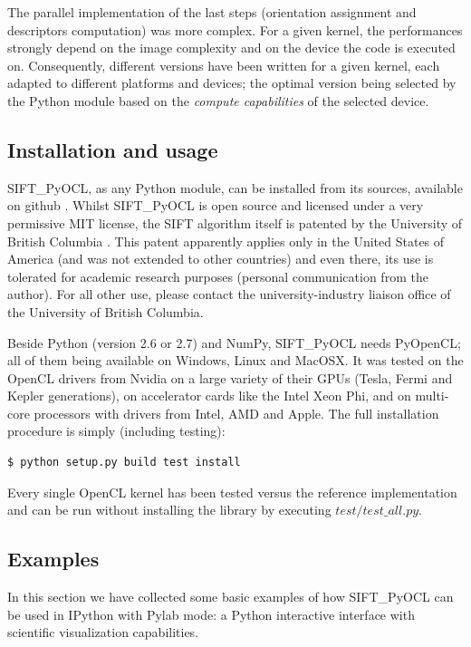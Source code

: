 \documentclass[preprint]{iucr}
\begin{document}
The parallel implementation of the last steps (orientation assignment and
descriptors computation) was more complex.
For a given kernel, the performances strongly depend on the image
complexity and on the device the code is executed on.
Consequently, different versions have been written for a given kernel, each
adapted to different platforms and
devices; the optimal version being selected by the
Python module based on the \emph{compute capabilities} of the selected device.


\subsection{Installation and usage}
SIFT\_PyOCL, as any Python module, can be installed from its sources,
available on github \cite{sift_pyocl}.
Whilst SIFT\_PyOCL is open source and licensed under a very
permissive MIT license, the SIFT algorithm itself is
patented by the University of British Columbia \cite{SIFT_pat}.
This patent apparently applies only in the United States of America
(and was not extended to other countries) and even there, its use is
tolerated for academic research purposes (personal communication from the
author). For all other use, please contact the university-industry liaison
office of the University of British Columbia.

Beside Python (version 2.6 or 2.7) and NumPy, SIFT\_PyOCL needs
PyOpenCL; all of them being available on Windows, Linux and MacOSX.
It was tested on the OpenCL drivers from Nvidia on a
large variety of their GPUs (Tesla, Fermi and Kepler generations), on
accelerator cards like the Intel Xeon Phi,  and on multi-core processors with
drivers from Intel, AMD and Apple.
The full installation procedure is simply (including testing):
\begin{verbatim}
$ python setup.py build test install
\end{verbatim}
Every single OpenCL kernel has been tested versus the reference
implementation and can be run without installing the library by
executing $test/test\_all.py$.

\subsection{Examples}

In this section we have collected some basic examples of how
SIFT\_PyOCL can be used in IPython \cite{ipython} with Pylab \cite{matplotlib}
mode: a Python interactive interface with scientific visualization
capabilities.
\end{document}
